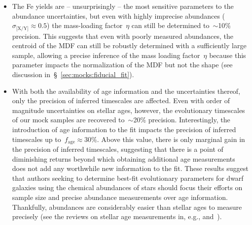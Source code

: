 \documentclass[ms.tex]{subfiles}
\begin{document}
\begin{itemize}
	\item The Fe yields are -- unsurprisingly -- the most sensitive parameters
	to the abundance uncertainties, but even with highly imprecise abundances
	($\sigma_\text{[X/Y]} \approx 0.5$) the mass-loading factor~$\eta$ can
	still be determined to~$\sim$10\% precision.
	This suggests that even with poorly measured abundances, the centroid of
	the MDF can still be robustly determined with a sufficiently large sample,
	allowing a precise inference of the mass loading factor~$\eta$ because this
	parameter impacts the normalization of the MDF but not the shape (see
	discussion in~\S~\ref{sec:mocks:fiducial_fit}).

	\item With both the availability of age information and the uncertainties
	thereof, only the precision of inferred timescales are affected.
	Even with order of magnitude uncertainties on stellar ages, however, the
	evolutionary timescales of our mock samples are recovered to~$\sim$20\%
	precision.
	Interestingly, the introduction of age information to the fit impacts the
	precision of inferred timescales up to~$f_\text{age} \approx 30\%$.
	Above this value, there is only marginal gain in the precision of inferred
	timescales, suggesting that there is a point of diminishing returns beyond
	which obtaining additional age measurements does not add any worthwhile new
	information to the fit.
	These results suggest that authors seeking to determine best-fit
	evolutionary parameters for dwarf galaxies using the chemical abundances of
	stars should focus their efforts on sample size and precise abundance
	measurements over age information.
	Thankfully, abundances are considerably easier than stellar ages to measure
	precisely (see the reviews on stellar age measurements in, e.g.,
	\citealp{Soderblom2010} and~\citealp{Chaplin2013}).


\end{itemize}
\end{document}
